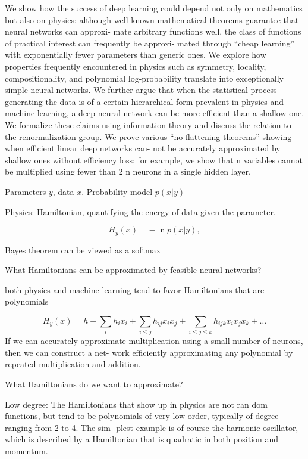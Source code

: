 \documentclass[english]{article}
\begin{document}
\item We show how the success of deep learning could depend not only on mathematics but also on
physics: although well-known mathematical theorems guarantee that neural networks can approxi-
mate arbitrary functions well, the class of functions of practical interest can frequently be approxi-
mated through “cheap learning” with exponentially fewer parameters than generic ones. We explore
how properties frequently encountered in physics such as symmetry, locality, compositionality, and
polynomial log-probability translate into exceptionally simple neural networks. We further argue
that when the statistical process generating the data is of a certain hierarchical form prevalent
in physics and machine-learning, a deep neural network can be more efficient than a shallow one.
We formalize these claims using information theory and discuss the relation to the renormalization
group. We prove various “no-flattening theorems” showing when efficient linear deep networks can-
not be accurately approximated by shallow ones without efficiency loss; for example, we show that
n variables cannot be multiplied using fewer than 2 n neurons in a single hidden layer.

\item Parameters $y$, data $x$. Probability model $p(x|y)$

Physics: Hamiltonian, quantifying the energy of data given the parameter.

$$H_y(x) = -\ln p(x|y),$$

Bayes theorem can be viewed as a softmax

\item What Hamiltonians can be approximated by
feasible neural networks?

both physics and machine learning tend to favor Hamiltonians that are polynomials 

$$H_y(x)= 
h+
\sum_i h_i x_i +
\sum_{i\le j} h_{ij} x_i x_j +
\sum_{i\le j\le k} h_{ijk} x_i x_j x_k +\ldots
$$
If we can accurately approximate multiplication using a
small number of neurons, then we can construct a net-
work efficiently approximating any polynomial by
repeated multiplication and addition.

\item What Hamiltonians do we want to
approximate?

\benum 
\item 
Low degree: The Hamiltonians that show up in physics are not ran
dom functions, but tend to be polynomials of very low
order, typically of degree ranging from 2 to 4. The sim-
plest example is of course the harmonic oscillator, which
is described by a Hamiltonian that is quadratic in both
position and momentum.
\end{document}
